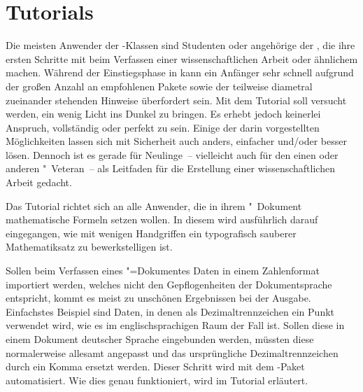 \chapter{%
  Tutorials%
  \label{sec:tut}%
}
Die meisten Anwender der \TUDScript-Klassen sind Studenten oder angehörige der 
\TnUD, die ihre ersten Schritte mit  beim Verfassen einer 
wissenschaftlichen Arbeit oder ähnlichem machen. Während der Einstiegsphase in 
 kann ein Anfänger sehr schnell aufgrund der großen Anzahl an 
empfohlenen Pakete sowie der teilweise diametral zueinander stehenden Hinweise 
überfordert sein. Mit dem Tutorial  soll versucht 
werden, ein wenig Licht ins Dunkel zu bringen. Es erhebt jedoch keinerlei 
Anspruch, vollständig oder perfekt zu sein. Einige der darin vorgestellten 
Möglichkeiten lassen sich mit Sicherheit auch anders, einfacher und/oder besser 
lösen. Dennoch ist es gerade für Neulinge~-- vielleicht auch für den einen oder 
anderen "~Veteran~-- als Leitfaden für die Erstellung einer 
wissenschaftlichen Arbeit gedacht.

Das Tutorial  richtet sich an alle Anwender, die in 
ihrem "~Dokument mathematische Formeln setzen wollen. In diesem 
wird ausführlich darauf eingegangen, wie mit wenigen Handgriffen ein 
typografisch sauberer Mathematiksatz zu bewerkstelligen ist.

Sollen beim Verfassen eines "=Dokumentes Daten in einem 
Zahlenformat importiert werden, welches nicht den Gepflogenheiten der 
Dokumentsprache entspricht, kommt es meist zu unschönen Ergebnissen bei der 
Ausgabe. Einfachstes Beispiel sind Daten, in denen als Dezimaltrennzeichen ein 
Punkt verwendet wird, wie es im englischsprachigen Raum der Fall ist. Sollen 
diese in einem Dokument deutscher Sprache eingebunden werden, müssten diese 
normalerweise allesamt angepasst und das ursprüngliche Dezimaltrennzeichen 
durch ein Komma ersetzt werden. Dieser Schritt wird mit dem \TUDScript-Paket 
 automatisiert. Wie dies genau funktioniert, wird im Tutorial 
 erläutert.%
%
